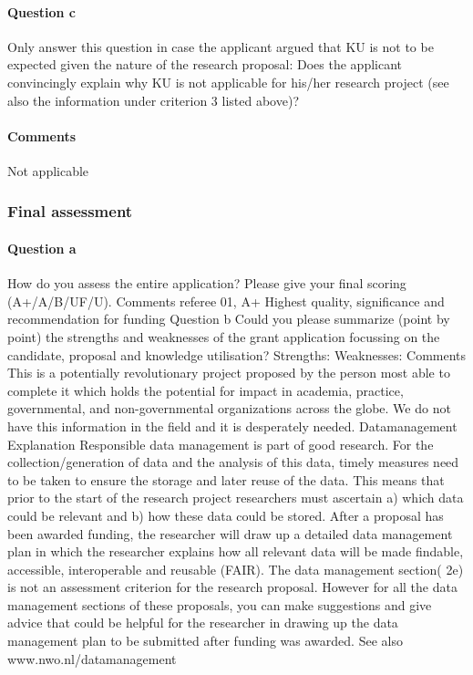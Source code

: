 \documentclass[twocolumn, serif, rga, numeric]{jote-article}
\begin{document}
\paragraph{Question c}
Only answer this question in case the applicant argued that KU is not to be expected given the nature of the research proposal: Does the applicant convincingly explain why KU is not applicable for his/her research project (see also the information under criterion 3 listed above)?
\paragraph{Comments}
Not applicable
\subsubsection{Final assessment}
\paragraph{Question a}
How do you assess the entire application? Please give your final scoring (A+/A/B/UF/U).
Comments referee
01, A+ Highest quality, significance and recommendation for funding
Question b
Could you please summarize (point by point) the strengths and weaknesses of the grant application focussing on the candidate, proposal and knowledge utilisation? Strengths:
Weaknesses:
Comments
This is a potentially revolutionary project proposed by the person most able to complete it which holds the potential for impact in academia, practice, governmental, and non-governmental organizations across the globe. We do not have this information in the field and it is desperately needed.
Datamanagement
Explanation
Responsible data management is part of good research. For the collection/generation of data and the analysis of this data, timely measures need to be taken to ensure the storage and later reuse of the data. This means that prior to the start of the research project researchers must ascertain a) which data could be relevant and b) how these data could be stored. After a proposal has been awarded funding, the researcher will draw up a detailed data management plan in which the researcher explains how all relevant data will be made findable, accessible, interoperable and reusable (FAIR). The data management section( 2e) is not an assessment criterion for the research proposal. However for all the data management sections of these proposals, you can make suggestions and give advice that could be helpful for the researcher in drawing up the data management plan to be submitted after funding was awarded. See also www.nwo.nl/datamanagement
\end{document}
